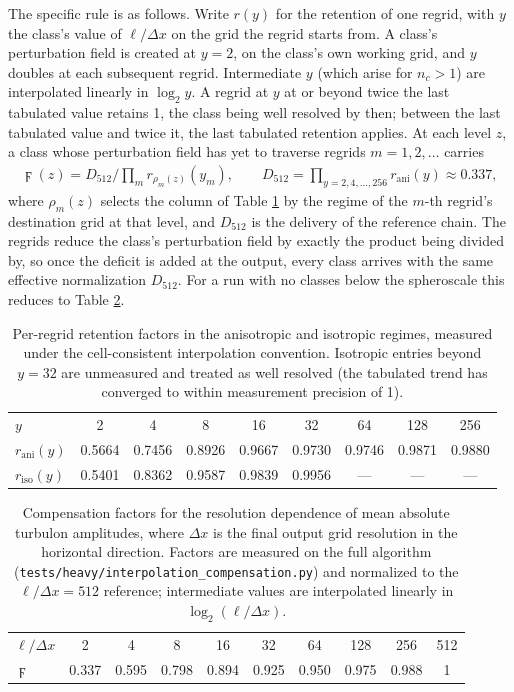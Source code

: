 \documentclass{article}
\begin{document}
The specific rule is as follows. Write $r(y)$ for the retention of one regrid, with $y$ the class's value of $\ell/\Delta x$ on the grid the regrid starts from. A class's perturbation field is created at $y = 2$, on the class's own working grid, and $y$ doubles at each subsequent regrid. Intermediate $y$ (which arise for $n_c > 1$) are interpolated linearly in $\log_2 y$. A regrid at $y$ at or beyond twice the last tabulated value retains 1, the class being well resolved by then; between the last tabulated value and twice it, the last tabulated retention applies. At each level $z$, a class whose perturbation field has yet to traverse regrids $m = 1, 2, \dots$ carries
\begin{align}
  \digamma(z) = D_{512} \Big/ \prod_m r_{\rho_m(z)}(y_m), \qquad
  D_{512} = \prod_{y = 2, 4, \dots, 256} r_{\mathrm{ani}}(y) \approx 0.337,
\end{align}
where $\rho_m(z)$ selects the column of Table \ref{tab:hop retention} by the regime of the $m$-th regrid's destination grid at that level, and $D_{512}$ is the delivery of the reference chain. The regrids reduce the class's perturbation field by exactly the product being divided by, so once the deficit is added at the output, every class arrives with the same effective normalization $D_{512}$. For a run with no classes below the spheroscale this reduces to Table \ref{tab:interpolation compensation}.

\begin{table}
\centering
\begin{tabular}{lcccccccc}
\hline
$y$ & 2 & 4 & 8 & 16 & 32 & 64 & 128 & 256 \\
$r_{\mathrm{ani}}(y)$ & 0.5664 & 0.7456 & 0.8926 & 0.9667 & 0.9730 & 0.9746 & 0.9871 & 0.9880 \\
$r_{\mathrm{iso}}(y)$ & 0.5401 & 0.8362 & 0.9587 & 0.9839 & 0.9956 & --- & --- & --- \\
\hline
\end{tabular}
\caption{Per-regrid retention factors in the anisotropic and isotropic regimes, measured under the cell-consistent interpolation convention. Isotropic entries beyond $y = 32$ are unmeasured and treated as well resolved (the tabulated trend has converged to within measurement precision of 1).}\label{tab:hop retention}
\end{table}

\begin{table}
\centering
\begin{tabular}{lccccccccc}
\hline
$\ell/\Delta x$ & 2 & 4 & 8 & 16 & 32 & 64 & 128 & 256 & 512 \\
$\digamma$ & 0.337 & 0.595 & 0.798 & 0.894 & 0.925 & 0.950 & 0.975 & 0.988 & 1 \\
\hline
\end{tabular}
\caption{Compensation factors for the resolution dependence of mean absolute turbulon amplitudes, where $\Delta x$ is the final output grid resolution in the horizontal direction. Factors are measured on the full algorithm (\texttt{tests/heavy/interpolation\_compensation.py}) and normalized to the $\ell/\Delta x = 512$ reference; intermediate values are interpolated linearly in $\log_2(\ell/\Delta x)$.}\label{tab:interpolation compensation}
\end{table}
\end{document}
